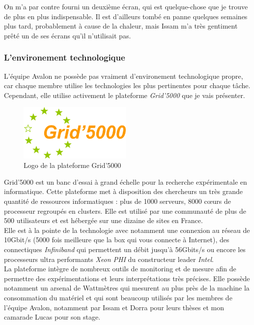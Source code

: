 On m'a par contre fourni un deuxième écran, qui est quelque-chose que je trouve de plus en plus indispensable. Il est d'ailleurs tombé en panne quelques semaines plus tard, probablement à cause de la chaleur, mais Issam m'a très gentiment prêté un de ses écrans qu'il n'utilisait pas.

\subsubsection{L'environement technologique}
L'équipe Avalon ne possède pas vraiment d'environement technologique propre, car chaque membre utilise les technologies les plus pertinentes pour chaque tâche. Cependant, elle utilise activement le plateforme \emph{Grid'5000} que je vais présenter.\\

\begin{figure}[h!]
	\centering
	\includegraphics[width=5.5cm]{partie1/images/grid5000_logo.png}
	\caption{Logo de la plateforme Grid'5000}
\end{figure}

Grid'5000 est un banc d'essai à grand échelle pour la recherche expérimentale en informatique. Cette plateforme met à disposition des chercheurs un très grande quantité de ressources informatiques : plus de 1000 serveurs, 8000 cœurs de processeur regroupés en \glspl{cluster}. Elle est utilisé par une communauté de plus de 500 utilisateurs et est hébergée sur une dizaine de sites en France. \cite{grid5000home}\\

Elle est à la pointe de la technologie avec notamment une connexion au réseau de 10Gbit/s (5000 fois meilleure que la box qui vous connecte à Internet), des connectiques \emph{Infiniband} qui permettent un débit jusqu'à 56Gbits/s ou encore les processeurs ultra performants \emph{Xeon PHI} du constructeur leader \emph{Intel}.\\

La plateforme intègre de nombreux outils de monitoring et de mesure afin de permettre des expérimentations et leurs interprétations très précises. Elle possède notamment un arsenal de Wattmètres qui mesurent au plus près de la machine la consommation du matériel et qui sont beaucoup utilisés par les membres de l'équipe Avalon, notamment par Issam et Dorra pour leurs thèses et mon camarade Lucas pour son stage.\\

